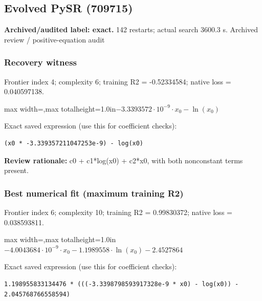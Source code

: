 \documentclass[10pt,letterpaper,landscape]{article}
\begin{document}
\begin{minipage}[t]{0.485\textwidth}
\subsection*{Evolved PySR (709715)}
\textbf{Archived/audited label: exact.} 142 restarts; actual search 3600.3 s.
{\small Archived review / positive-equation audit}
\subsubsection*{Recovery witness}
Frontier index 4; complexity 6; training R2 = -0.52334584; native loss = 0.040597138.
\begin{center}\begin{adjustbox}{max width=\linewidth,max totalheight=1.0in}$\displaystyle - 3.3393572 \cdot 10^{-9} \cdot x_{0} - \ln{\left(x_{0} \right)}$\end{adjustbox}\end{center}
{\scriptsize Exact saved expression (use this for coefficient checks):}
\begin{lstlisting}
(x0 * -3.339357211047253e-9) - log(x0)
\end{lstlisting}
{\small\textbf{Review rationale:} c0 + c1*log(x0) + c2*x0, with both nonconstant terms present.}
\subsubsection*{Best numerical fit (maximum training R2)}
Frontier index 6; complexity 10; training R2 = 0.99830372; native loss = 0.038593811.
\begin{center}\begin{adjustbox}{max width=\linewidth,max totalheight=1.0in}$\displaystyle - 4.0043684 \cdot 10^{-9} \cdot x_{0} - 1.1989558 \cdot \ln{\left(x_{0} \right)} - 2.4527864$\end{adjustbox}\end{center}
{\scriptsize Exact saved expression (use this for coefficient checks):}
\begin{lstlisting}
1.198955833134476 * (((-3.3398798593917328e-9 * x0) - log(x0)) - 2.045768766558594)
\end{lstlisting}
\end{minipage}
\clearpage{}\label{schechter-10008}
\end{document}
